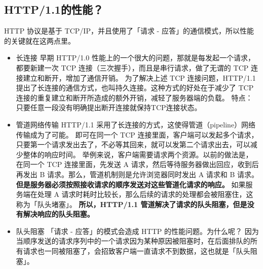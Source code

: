 \documentclass[11pt]{article}
\begin{document}
\subsection{HTTP/1.1的性能？}
\label{sec:org8fae72b}
HTTP 协议是基于 TCP/IP，并且使用了「请求 - 应答」的通信模式，所以性能的关键就在这两点里。
\begin{itemize}
\item 长连接
早期 HTTP/1.0 性能上的一个很大的问题，那就是每发起一个请求，都要新建一次 TCP 连接（三次握手），而且是串行请求，做了无谓的 TCP 连接建立和断开，增加了通信开销。
为了解决上述 TCP 连接问题，HTTP/1.1 提出了长连接的通信方式，也叫持久连接。这种方式的好处在于减少了 TCP 连接的重复建立和断开所造成的额外开销，减轻了服务器端的负载。
特点：只要任意一段没有明确提出断开连接就保持TCP连接状态。
\item 管道网络传输
HTTP/1.1 采用了长连接的方式，这使得管道（pipeline）网络传输成为了可能。
即可在同一个 TCP 连接里面，客户端可以发起多个请求，只要第一个请求发出去了，不必等其回来，就可以发第二个请求出去，可以减少整体的响应时间。
举例来说，客户端需要请求两个资源。以前的做法是，在同一个 TCP 连接里面，先发送 A 请求，然后等待服务器做出回应，收到后再发出 B 请求。那么，管道机制则是允许浏览器同时发出 A 请求和 B 请求。
\textbf{但是服务器必须按照接收请求的顺序发送对这些管道化请求的响应。}
如果服务端在处理 A 请求时耗时比较长，那么后续的请求的处理都会被阻塞住，这称为「队头堵塞」。
\textbf{所以，HTTP/1.1 管道解决了请求的队头阻塞，但是没有解决响应的队头阻塞。}
\item 队头阻塞
「请求 - 应答」的模式会造成 HTTP 的性能问题。为什么呢？
因为当顺序发送的请求序列中的一个请求因为某种原因被阻塞时，在后面排队的所有请求也一同被阻塞了，会招致客户端一直请求不到数据，这也就是「队头阻塞」。
\end{itemize}
\end{document}
